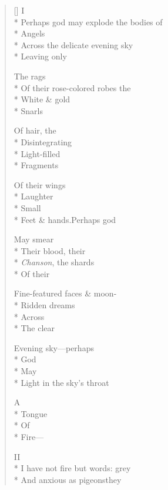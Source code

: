\label{ch:a_fragment}
\settowidth{\versewidth}{Command to shatter their clay hearts: with a cry}
\begin{verse}[\versewidth]
\hspace{0.45\versewidth}I\\*
Perhaps god may explode the bodies of\\*
Angels\\*
 Across the delicate evening sky\\*
 Leaving only

The rags\\*
 Of their rose-colored robes the\\*
 White \& gold\\*
 Snarls

Of hair, the\\*
 Disintegrating\\*
 Light-filled\\*
 Fragments

Of their wings\\*
 Laughter\\*
 Small\\*
Feet \& hands.\qquad Perhaps god

May smear\\*
 Their blood, their\\*
\textit{Chanson}, the shards\\*
 Of their

Fine-featured faces \& moon-\\*
 Ridden dreams\\*
Across\\*
\qquad The clear

Evening sky---perhaps\\*
God\\*
\qquad May\\*
Light in the sky's throat

A\\*
Tongue\\*
Of\\*
Fire---

\hspace{0.45\versewidth}II\\*
I have not fire but words: grey\\*
And anxious as pigeons\qquad they


\end{verse}
